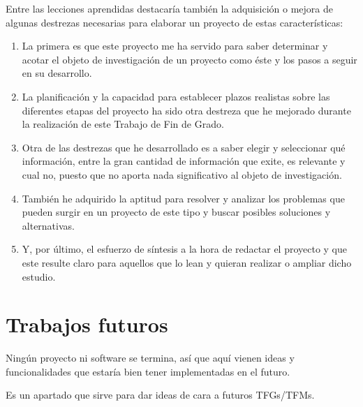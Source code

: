 \documentclass[a4paper, 12pt]{book}
\begin{document}
Entre las lecciones aprendidas destacaría también la adquisición o mejora de algunas destrezas necesarias para elaborar un proyecto de estas características:
\begin{enumerate}
  \item  La primera es que este proyecto me ha servido para saber determinar y acotar el objeto de investigación de un proyecto como éste y los pasos a seguir en su desarrollo.
  \item  La planificación y la capacidad para establecer plazos realistas sobre las diferentes etapas del proyecto ha sido otra destreza que he mejorado durante la realización de este Trabajo de Fin de Grado.
  \item  Otra de las destrezas que he desarrollado es a saber elegir y seleccionar qué información, entre la gran cantidad de información que exite, es relevante y cual no, puesto que no aporta nada significativo al objeto de investigación.
  \item  También he adquirido la aptitud para resolver y analizar los problemas que pueden surgir en un proyecto de este tipo y buscar posibles soluciones y alternativas.  
  \item  Y, por último, el esfuerzo de síntesis a la hora de redactar el proyecto y que este resulte claro para aquellos que lo lean y quieran realizar o ampliar dicho estudio. 
\end{enumerate}

\section{Trabajos futuros}
\label{sec:trabajos_futuros}

Ningún proyecto ni software se termina, así que aquí vienen ideas y funcionalidades que estaría bien tener implementadas en el futuro.

Es un apartado que sirve para dar ideas de cara a futuros TFGs/TFMs.



\end{document}
